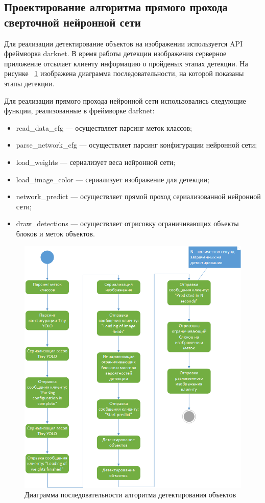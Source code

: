 \documentclass[a4paper,english,russian]{G2-105}
\begin{document}
\subsection{Проектирование алгоритма прямого прохода сверточной нейронной сети}
\par Для реализации детектирование объектов на изображении используется API фреймворка darknet. В время работы детекции изображения серверное приложение отсылает клиенту информацию о пройденых этапах детекции. На рисунке ~\ref{activitydetector} изображена диаграмма последовательности, на которой показаны этапы детекции.
\par Для реализации прямого прохода нейронной сети использовались следующие функции, реализованные в фреймворке darknet:
\begin{itemize}
\item read\_data\_cfg --- осуществляет парсинг меток классов;
\item parse\_network\_cfg --- осуществляет парсинг конфигурации нейронной сети;
\item load\_weights --- сериализует веса нейронной сети;
\item load\_image\_color --- сериализует изображение для детекции;
\item network\_predict --- осуществляет прямой проход сериализованной нейронной сети;
\item draw\_detections --- осуществляет отрисовку ограничивающих объекты блоков и меток объектов.
\end{itemize}
\begin{figure}
    \includegraphics[width=0.8\linewidth]{activitydetector.png}
    \caption{Диаграмма последовательности алгоритма детектирования объектов}
	\label{activitydetector}
\end{figure}
\ttl
\end{document}
